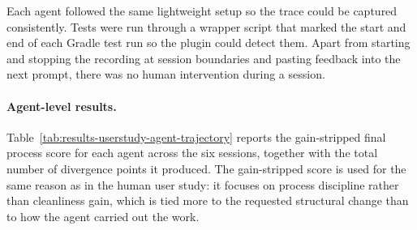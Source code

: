 Each agent followed the same lightweight setup so the trace could be captured consistently. Tests were run through a wrapper script that marked the start and end of each Gradle test run so the plugin could detect them. Apart from starting and stopping the recording at session boundaries and pasting feedback into the next prompt, there was no human intervention during a session.

\paragraph{Agent-level results.}
Table~\ref{tab:results-userstudy-agent-trajectory} reports the gain-stripped final process score for each agent across the six sessions, together with the total number of divergence points it produced. The gain-stripped score is used for the same reason as in the human user study: it focuses on process discipline rather than cleanliness gain, which is tied more to the requested structural change than to how the agent carried out the work.

